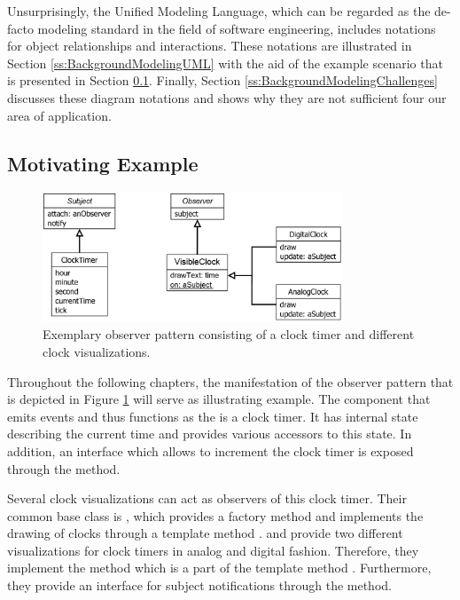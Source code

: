 Unsurprisingly, the Unified Modeling Language, which can be regarded as the de-facto modeling standard in the field of software engineering, includes notations for object relationships and interactions.
These notations are illustrated in Section \ref{ss:BackgroundModelingUML} with the aid of the example scenario that is presented in Section \ref{ss:BackgroundModelingExample}.
Finally, Section \ref{ss:BackgroundModelingChallenges} discusses these diagram notations and shows why they are not sufficient four our area of application.


\subsection{Motivating Example}
\label{ss:BackgroundModelingExample}

\begin{figure}[tb]
	\centering
	\includegraphics[width=0.8\textwidth]{../images/02-ObserverExample}
	\caption[Exemplary Observer Pattern]{Exemplary observer pattern consisting of a clock timer and different clock visualizations.}
	\label{fig:BackgroundExample}
\end{figure}

Throughout the following chapters, the manifestation of the observer pattern \cite{gamma_design_1995} that is depicted in Figure \ref{fig:BackgroundExample} will serve as illustrating example.
The component that emits events and thus functions as the  is a clock timer.
It has internal state describing the current time and provides various accessors to this state.
In addition, an interface which allows to increment the clock timer is exposed through the  method.

Several clock visualizations can act as observers of this clock timer.
Their common base class is , which provides a factory method \cite{gamma_design_1995} and implements the drawing of clocks through a template method \cite{gamma_design_1995}.
 and  provide two different visualizations for clock timers in analog and digital fashion.
Therefore, they implement the  method which is a part of the template method .
Furthermore, they provide an interface for subject notifications through the  method.


